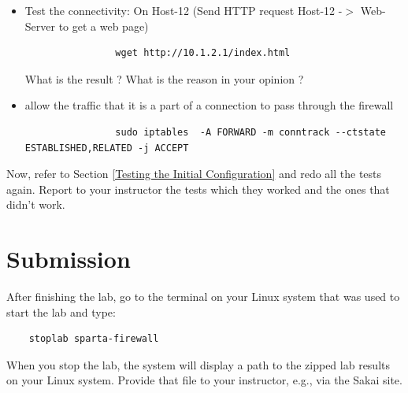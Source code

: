 \begin{itemize}
			\item Test the connectivity: On Host-12 (Send HTTP request Host-12 -$>$ Web-Server to get a web page)
			\begin{verbatim}
			    wget http://10.1.2.1/index.html
			\end{verbatim}

			What is the result ? What is the reason in your opinion ?

		\item allow the traffic that it is a part of a connection to pass through the firewall
		\begin{verbatim}
				sudo iptables  -A FORWARD -m conntrack --ctstate ESTABLISHED,RELATED -j ACCEPT
		\end{verbatim}
\end{itemize}

Now, refer to Section \ref{Testing the Initial Configuration} and redo all the tests again. Report to your instructor the tests which they worked and the ones that didn't work.


\section{Submission}
After finishing the lab, go to the terminal on your Linux system that was used to start the lab and type:
\begin{verbatim}
    stoplab sparta-firewall
\end{verbatim}
When you stop the lab, the system will display a path to the zipped lab results on your Linux system.  Provide that file to
your instructor, e.g., via the Sakai site.


